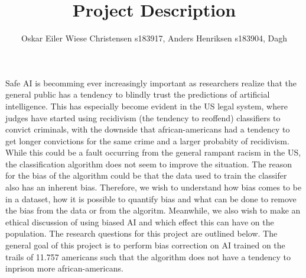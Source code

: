 \documentclass[11pt, fleqn]{article}
\title{Project Description}
\author{Oskar Eiler Wiese Christensen s183917, Anders Henriksen s183904, Dagh}
\begin{document}
	\maketitle
	\newpage
	
	\noindent
	Safe AI is becomming ever increasingly important as researchers realize that the general public has a tendency to blindly trust the predictions of artificial intelligence. This has especially become evident in the US legal system, where judges have started using recidivism (the tendency to reoffend) classifiers to convict criminals, with the downside that african-americans had a tendency to get longer convictions for the same crime and a larger probabity of recidivism. While this could be a fault occurring from the general rampant racism in the US, the classification algorithm does not seem to improve the situation. The reason for the bias of the algorithm could be that the data used to train the classifer also has an inherent bias. Therefore, we wish to understand how bias comes to be in a dataset, how it is possible to quantify bias and what can be done to remove the bias from the data or from the algoritm. Meanwhile, we also wish to make an ethical discussion of using biased AI and which effect this can have on the population. The research questions for this project are outlined below. The general goal of this project is to perform bias correction on AI trained on the trails of 11.757 americans such that the algorithm does not have a tendency to inprison more african-americans.
	
	
	
	
\end{document}
